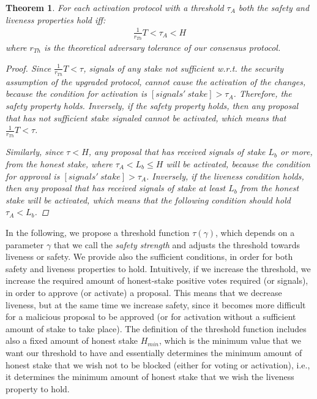 \documentclass[11pt,a4paper]{article}
\newtheorem{proof}{Proof}
\newtheorem{theorem}{Theorem}
\begin{document}
\begin{theorem}\label{th:safety_and_liveness_condition_activation}
	For each activation protocol with a threshold $\tau_A$
	both the safety and liveness properties hold iff:
	\begin{align*}
		\frac{1}{r_{Th}}T < \tau_A < H
	\end{align*}
	where $r_{Th}$ is the
	theoretical
	adversary tolerance of our consensus protocol.
	\begin{proof}
		Since $\frac{1}{r_{Th}}T < \tau$, signals of any stake not sufficient w.r.t.
    the security assumption of the upgraded protocol, cannot cause the
    activation of the changes, because the condition for activation is
    $[signals'\ stake] > \tau_A$. Therefore, the safety property holds.
    Inversely, if the safety property holds, then any proposal that has not
    sufficient stake signaled cannot be activated, which means that
    $\frac{1}{r_{Th}}T < \tau$.

		Similarly, since $\tau < H$, any proposal that has
		received signals of stake $L_b$ or more, from the honest stake, where $
		\tau_A < L_b \leq H$ will be
		activated, because the condition for approval is $[signals'\ stake] >
		\tau_A$. Inversely, if the liveness condition holds, then any proposal
		that has received signals of stake  at least $L_b$ from the honest
		stake
		will be activated, which means that the following
		condition should hold $\tau_A < L_b$.
	\end{proof}
\end{theorem}

In the following, we propose a threshold function $\tau(\gamma)$, which depends
on a parameter $\gamma$ that we call the \emph{safety strength} and adjusts the
threshold towards liveness or safety. We provide also the sufficient conditions,
in order for both safety and liveness properties to hold. Intuitively, if we
increase the threshold, we increase the required amount of honest-stake positive
votes required (or signals), in order to approve (or activate) a proposal. This
means that we decrease liveness, but at the same time we increase safety, since
it becomes more difficult for a malicious proposal to be approved (or for
activation without a sufficient amount of stake to take place). The definition
of the threshold function includes also a fixed amount of honest stake
$H_{min}$, which is the minimum value that we want our threshold to have and
essentially determines the minimum amount of honest stake that we wish not to be
blocked (either for voting or activation), i.e., it determines the minimum
amount of honest stake that we wish the liveness property to hold.
\end{document}
